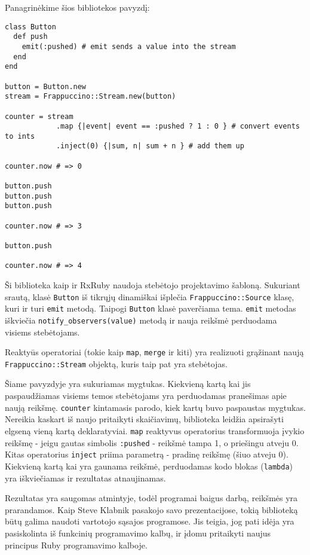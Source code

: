 Panagrinėkime šios bibliotekos pavyzdį:

\begin{lstlisting}[]
class Button
  def push
    emit(:pushed) # emit sends a value into the stream
  end
end

button = Button.new
stream = Frappuccino::Stream.new(button)

counter = stream
            .map {|event| event == :pushed ? 1 : 0 } # convert events to ints
            .inject(0) {|sum, n| sum + n } # add them up

counter.now # => 0

button.push
button.push
button.push

counter.now # => 3

button.push

counter.now # => 4
\end{lstlisting}

Ši biblioteka kaip ir RxRuby naudoja stebėtojo projektavimo šabloną. Sukuriant srautą, klasė \lstinline|Button| iš tikrųjų dinamiškai išplečia \lstinline|Frappuccino::Source| klasę, kuri ir turi \lstinline|emit| metodą. Taipogi \lstinline|Button| klasė paverčiama tema. \lstinline|emit| metodas iškviečia \lstinline|notify_observers(value)| metodą ir nauja reikšmė perduodama visiems stebėtojams.

Reaktyūs operatoriai (tokie kaip \lstinline|map|, \lstinline|merge| ir kiti) yra realizuoti grąžinant naują \lstinline|Frappuccino::Stream| objektą, kuris taip pat yra stebėtojas.

Šiame pavyzdyje yra sukuriamas mygtukas. Kiekvieną kartą kai jis paspaudžiamas visiems temos stebėtojams yra perduodamas pranešimas apie naują reikšmę. \lstinline|counter| kintamasis parodo, kiek kartų buvo paspaustas mygtukas. Nereikia kaskart iš naujo pritaikyti skaičiavimų, biblioteka leidžia apsirašyti elgseną vieną kartą deklaratyviai. \lstinline|map| reaktyvus operatorius transformuoja įvykio reikšmę - jeigu gautas simbolis \lstinline|:pushed| - reikšmė tampa 1, o priešingu atveju 0. Kitas operatorius \lstinline|inject| priima parametrą - pradinę reikšmę (šiuo atveju 0). Kiekvieną kartą kai yra gaunama reikšmė, perduodamas kodo blokas (\lstinline|lambda|) yra iškviečiamas ir rezultatas atnaujinamas.

Rezultatas yra saugomas atmintyje, todėl programai baigus darbą, reikšmės yra prarandamos. Kaip Steve Klabnik pasakojo savo prezentacijose, tokią biblioteką būtų galima naudoti vartotojo sąsajos programose. Jis teigia, jog pati idėja yra pasiskolinta iš funkcinių programavimo kalbų, ir įdomu pritaikyti naujus principus Ruby programavimo kalboje.

